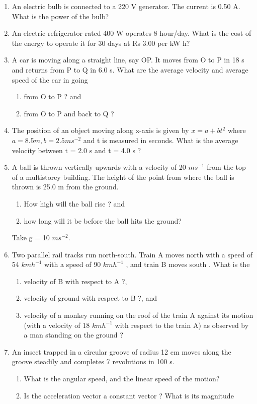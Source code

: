 \begin{enumerate}[label=\arabic*.,ref=\thesection.\theenumi]
\item  An electric bulb is connected to a 220 V generator. The current is 0.50 A. What is the power of the bulb?
\item  An electric refrigerator rated 400 W operates 8 hour/day. What is the cost of the energy to operate it for 30 days at Rs 3.00 per kW h?
\item  A car is moving along a straight line, say OP. It moves from O to P in 18 s and returns from P to Q in 6.0 s. What are the average velocity and average speed of the car in going 
\begin{enumerate}
\item  from O to P ? and 
\item  from O to P and back to Q ?
\end{enumerate}
\item The position of an object moving along x-axis is given by $x = a + bt^2$ where $a = 8.5 m, b = 2.5 m s^{-2}$ and t is
measured in seconds.  What is the average velocity between t = 2.0 s and t = 4.0 s ?
\item  A ball is thrown vertically upwards with a velocity of 20 $ms^{-1}$ from the top of a multistorey building. The height of the point from where the ball is thrown is 25.0 m from the ground. 
\begin{enumerate}
\item  How high will the ball rise ? and 
\item  how long will it be before the ball hits the ground?
\end{enumerate} 
Take g = 10 $ms^{-2}$.
\item Two parallel rail tracks run north-south. Train A moves north with a speed of 54 $km h^{-1}$
with a speed of 90 $km h^{-1}$
, and train B moves south . What is the
\begin{enumerate}
\item  velocity of B with respect to A ?, 
\item  velocity of ground with respect to B ?, and
\item  velocity of a monkey running on the roof of the train A against its motion (with a velocity of 18 $km h^{-1}$
with
respect to the train A) as observed by a man standing on the ground ?
\end{enumerate}
\item An insect trapped in a circular groove of radius 12 cm moves along the groove steadily and completes 7 revolutions in 100 s. 
\begin{enumerate}
\item  What is the angular speed, and the linear speed of the motion? 
\item  Is the acceleration vector a constant vector ? What is its magnitude
\end{enumerate}
\end{enumerate}
